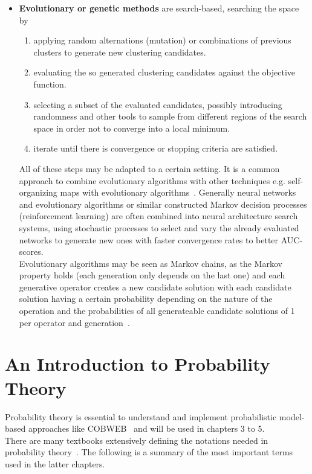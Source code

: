 \begin{itemize}
    \item \textbf{Evolutionary or genetic methods} are search-based, searching the space by 
        \begin{enumerate}
            \item applying random alternations (mutation) or combinations of previous clusters to generate new clustering candidates.
            \item evaluating the so generated clustering candidates against the objective function.
            \item selecting a subset of the evaluated candidates, possibly introducing randomness and other tools to sample from different regions of the search space in order not to converge into a local minimum.
            \item iterate until there is convergence or stopping criteria are satisfied.
        \end{enumerate}
        All of these steps may be adapted to a certain setting. It is a common approach to combine evolutionary algorithms with other techniques e.g. self-organizing maps with evolutionary algorithms~\cite{leng2006design}. 
        Generally neural networks and evolutionary algorithms or similar constructed Markov decision processes (reinforcement learning) are often combined into neural architecture search systems, using stochastic processes to select and vary the already evaluated networks to generate new ones with faster convergence rates to better AUC-scores\cite{kandasamy2018neural}. \\
        Evolutionary algorithms may be seen as Markov chains, as the Markov property holds (each generation only depends on the last one) and each generative operator creates a new candidate solution with each candidate solution having a certain probability depending on the nature of the operation and the probabilities of all generateable candidate solutions of 1 per operator and generation~\cite{Nix1992}.
\end{itemize}

\section{An Introduction to Probability Theory}
Probability theory is essential to understand and implement probabilistic model-based approaches like COBWEB~\cite{Fisher1987} and will be used in chapters 3 to 5. \\
There are many textbooks extensively defining the notations needed in probability theory~\cite{Baron:2013:PSC:2536837, fahrmeir2016statistik}. The following is a summary of the most important terms used in the latter chapters.\\

